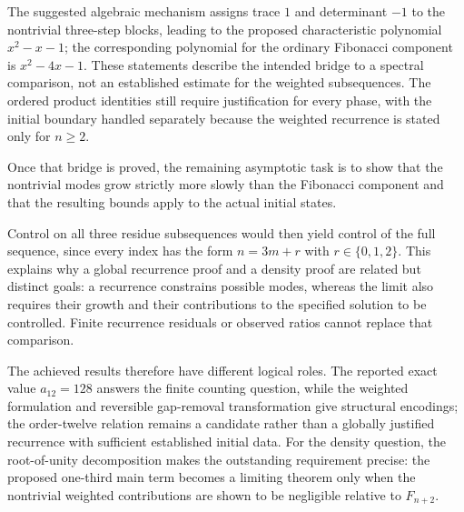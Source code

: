 \documentclass[11pt]{article}
\begin{document}
The suggested algebraic mechanism assigns trace $1$ and determinant $-1$ to the nontrivial three-step blocks, leading to the proposed characteristic polynomial $x^2-x-1$; the corresponding polynomial for the ordinary Fibonacci component is $x^2-4x-1$. These statements describe the intended bridge to a spectral comparison, not an established estimate for the weighted subsequences. The ordered product identities still require justification for every phase, with the initial boundary handled separately because the weighted recurrence is stated only for $n\geq2$.

Once that bridge is proved, the remaining asymptotic task is to show that the nontrivial modes grow strictly more slowly than the Fibonacci component and that the resulting bounds apply to the actual initial states.

Control on all three residue subsequences would then yield control of the full sequence, since every index has the form $n=3m+r$ with $r\in\{0,1,2\}$. This explains why a global recurrence proof and a density proof are related but distinct goals: a recurrence constrains possible modes, whereas the limit also requires their growth and their contributions to the specified solution to be controlled. Finite recurrence residuals or observed ratios cannot replace that comparison.

The achieved results therefore have different logical roles. The reported exact value $a_{12}=128$ answers the finite counting question, while the weighted formulation and reversible gap-removal transformation give structural encodings; the order-twelve relation remains a candidate rather than a globally justified recurrence with sufficient established initial data. For the density question, the root-of-unity decomposition makes the outstanding requirement precise: the proposed one-third main term becomes a limiting theorem only when the nontrivial weighted contributions are shown to be negligible relative to $F_{n+2}$.
\end{document}
